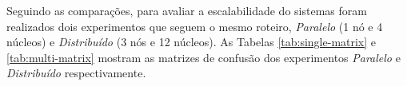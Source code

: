 




\newcommand{\single}{\textit{Paralelo}\xspace}
\newcommand{\multi}{\textit{Distribuído}\xspace}

Seguindo as comparações, para avaliar a escalabilidade do sistemas foram realizados 
dois experimentos que seguem o mesmo roteiro, \emph{Paralelo} (1 nó e 4 núcleos) e \emph{Distribuído} (3 nós e 12 núcleos). 
As Tabelas \ref{tab:single-matrix} e \ref{tab:multi-matrix} mostram as matrizes
de confusão dos experimentos \single e \multi respectivamente.

